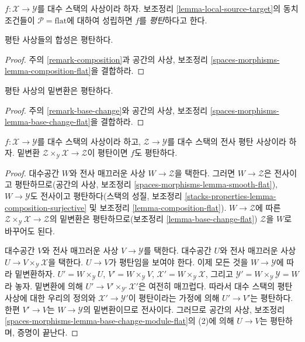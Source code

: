 \begin{definition}
\label{definition-flat}
$f : \mathcal{X} \to \mathcal{Y}$를 대수 스택의 사상이라 하자.
보조정리 \ref{lemma-local-source-target}의 동치 조건들이
$\mathcal{P} = \text{flat}$에 대하여 성립하면 $f$를 {\it 평탄}하다고
한다.
\end{definition}

\begin{lemma}
\label{lemma-composition-flat}
평탄 사상들의 합성은 평탄하다.
\end{lemma}

\begin{proof}
주의 \ref{remark-composition}과 공간의 사상, 보조정리
\ref{spaces-morphisms-lemma-composition-flat}을 결합하라.
\end{proof}

\begin{lemma}
\label{lemma-base-change-flat}
평탄 사상의 밑변환은 평탄하다.
\end{lemma}

\begin{proof}
주의 \ref{remark-base-change}와 공간의 사상, 보조정리
\ref{spaces-morphisms-lemma-base-change-flat}을 결합하라.
\end{proof}

\begin{lemma}
\label{lemma-descent-flat}
$f : \mathcal{X} \to \mathcal{Y}$를 대수 스택의 사상이라 하고,
$\mathcal{Z} \to \mathcal{Y}$를 대수 스택의 전사 평탄 사상이라 하자.
밑변환 $\mathcal{Z} \times_\mathcal{Y} \mathcal{X} \to \mathcal{Z}$이
평탄이면 $f$도 평탄하다.
\end{lemma}

\begin{proof}
대수공간 $W$와 전사 매끄러운 사상 $W \to \mathcal{Z}$을 택한다.
그러면 $W \to \mathcal{Z}$은 전사이고 평탄하므로(공간의 사상,
보조정리 \ref{spaces-morphisms-lemma-smooth-flat}),
$W \to \mathcal{Y}$도 전사이고 평탄하다(스택의 성질, 보조정리
\ref{stacks-properties-lemma-composition-surjective} 및 보조정리
\ref{lemma-composition-flat}). $W \to \mathcal{Z}$에 따른
$\mathcal{Z} \times_\mathcal{Y} \mathcal{X} \to \mathcal{Z}$의 밑변환은
평탄하므로(보조정리 \ref{lemma-base-change-flat}) $\mathcal{Z}$을 $W$로
바꾸어도 된다.

\medskip\noindent
대수공간 $V$와 전사 매끄러운 사상 $V \to \mathcal{Y}$를 택한다.
대수공간 $U$와 전사 매끄러운 사상
$U \to V \times_\mathcal{Y} \mathcal{X}$을 택한다. $U \to V$가
평탄임을 보여야 한다. 이제 모든 것을 $W \to \mathcal{Y}$에 따라
밑변환하자. $U' = W \times_\mathcal{Y} U$,
$V' = W \times_\mathcal{Y} V$,
$\mathcal{X}' = W \times_\mathcal{Y} \mathcal{X}$,
그리고 $\mathcal{Y}' = W \times_\mathcal{Y} \mathcal{Y} = W$라 놓자.
밑변환에 의해 $U' \to V' \times_{\mathcal{Y}'} \mathcal{X}'$은 여전히
매끄럽다. 따라서 대수 스택의 평탄 사상에 대한 우리의 정의와
$\mathcal{X}' \to \mathcal{Y}'$이 평탄이라는 가정에 의해
$U' \to V'$는 평탄하다. 한편 $V' \to V$는
$W \to \mathcal{Y}$의 밑변환이므로 전사이다. 그러므로 공간의 사상,
보조정리 \ref{spaces-morphisms-lemma-base-change-module-flat}의 (2)에 의해
$U \to V$는 평탄하며, 증명이 끝난다.
\end{proof}

